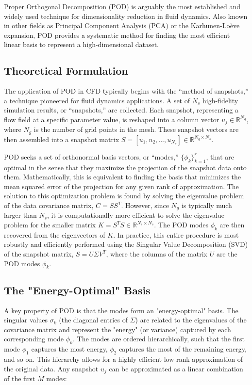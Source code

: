 Proper Orthogonal Decomposition (POD) is arguably the most established and widely used technique for dimensionality reduction in fluid dynamics. Also known in other fields as Principal Component Analysis (PCA) or the Karhunen-Loève expansion, POD provides a systematic method for finding the most efficient linear basis to represent a high-dimensional dataset. 

\subsection{Theoretical Formulation}

The application of POD in CFD typically begins with the ``method of snapshots,'' a technique pioneered for fluid dynamics applications. A set of $N_s$ high-fidelity simulation results, or ``snapshots,'' are collected. Each snapshot, representing a flow field at a specific parameter value, is reshaped into a column vector $u_j \in \mathbb{R}^{N_g}$, where $N_g$ is the number of grid points in the mesh. These snapshot vectors are then assembled into a snapshot matrix $S=[u_1, u_2, ..., u_{N_s}] \in \mathbb{R}^{N_g \times N_s}$.

POD seeks a set of orthonormal basis vectors, or ``modes,'' $\{\phi_k\}_{k=1}^r$, that are optimal in the sense that they maximize the projection of the snapshot data onto them. Mathematically, this is equivalent to finding the basis that minimizes the mean squared error of the projection for any given rank of approximation. The solution to this optimization problem is found by solving the eigenvalue problem of the data covariance matrix, $C=SS^T$. However, since $N_g$ is typically much larger than $N_s$, it is computationally more efficient to solve the eigenvalue problem for the smaller matrix $K=S^TS \in \mathbb{R}^{N_s \times N_s}$. The POD modes $\phi_k$ are then recovered from the eigenvectors of $K$. In practice, this entire procedure is most robustly and efficiently performed using the Singular Value Decomposition (SVD) of the snapshot matrix, $S=U\Sigma V^T$, where the columns of the matrix $U$ are the POD modes $\phi_k$.

\subsection{The "Energy-Optimal" Basis}

A key property of POD is that the modes form an "energy-optimal" basis. The singular values $\sigma_k$ (the diagonal entries of $\Sigma$) are related to the eigenvalues of the covariance matrix and represent the "energy" (or variance) captured by each corresponding mode $\phi_k$. The modes are ordered hierarchically, such that the first mode $\phi_1$ captures the most energy, $\phi_2$ captures the most of the remaining energy, and so on. This hierarchy allows for a highly efficient low-rank approximation of the original data. Any snapshot $u_j$ can be approximated as a linear combination of the first $M$ modes:

